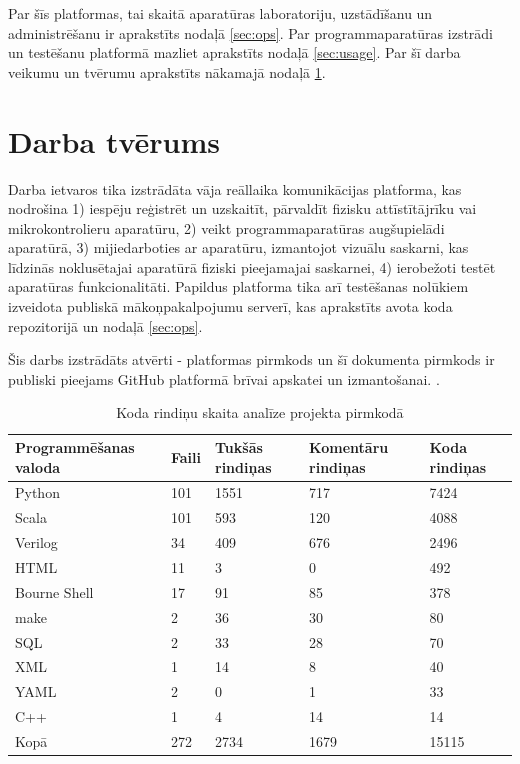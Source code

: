 Par šīs platformas, tai skaitā aparatūras laboratoriju, uzstādīšanu un
administrēšanu ir aprakstīts nodaļā \ref{sec:ops}. Par programmaparatūras
izstrādi un testēšanu platformā mazliet aprakstīts nodaļā \ref{sec:usage}. Par
šī darba veikumu un tvērumu aprakstīts nākamajā nodaļā \ref{sec:scope}.

\section{Darba tvērums}
\label{sec:scope}

Darba ietvaros tika izstrādāta vāja reāllaika komunikācijas platforma, kas
nodrošina 1) iespēju reģistrēt un uzskaitīt, pārvaldīt fizisku attīstītājrīku
vai mikrokontrolieru aparatūru, 2) veikt programmaparatūras augšupielādi
aparatūrā, 3) mijiedarboties ar aparatūru, izmantojot vizuālu saskarni, kas
līdzinās noklusētajai aparatūrā fiziski pieejamajai saskarnei, 4) ierobežoti
testēt aparatūras funkcionalitāti. Papildus platforma tika arī testēšanas
nolūkiem izveidota publiskā mākoņpakalpojumu serverī, kas aprakstīts avota koda
repozitorijā un nodaļā \ref{sec:ops}. \cite{VeinbahsKrisjanisTestbed}
\cite{VeinbahsKrisjanisProduction}

Šis darbs izstrādāts atvērti - platformas pirmkods un šī dokumenta pirmkods ir
publiski pieejams GitHub platformā brīvai apskatei un izmantošanai.
\cite{VeinbahsKrisjanisTestbed} \cite{VeinbahsKrisjanisThesis}.

\begin{table}[H]
    \begin{tabular}{ |p{3cm}|p{3cm}|p{3cm}|p{3cm}|p{3cm}| }
    \hline
    Programmēšanas valoda&Faili&Tukšās rindiņas&Komentāru rindiņas&Koda rindiņas\\
    \hline
    Python & 101 & 1551 & 717 & 7424\\
    Scala & 101 & 593 & 120 & 4088\\
    Verilog & 34 & 409 & 676 & 2496\\
    HTML & 11 & 3 & 0 & 492\\
    Bourne Shell & 17 & 91 & 85 & 378\\
    make & 2 & 36 & 30 & 80\\
    SQL & 2 & 33 & 28 & 70\\
    XML & 1 & 14 & 8 & 40\\
    YAML & 2 & 0 & 1 & 33\\
    C++ & 1 & 4 & 14 & 14\\
    \hhline{|=|=|=|=|=|}
    Kopā & 272 & 2734 & 1679 & 15115\\
    \hline
    \end{tabular}
    \centering
    \captionsetup{justification=centering}
    \caption{Koda rindiņu skaita analīze projekta pirmkodā}
    \label{table:cloc}
\end{table}

